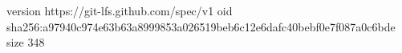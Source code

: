 version https://git-lfs.github.com/spec/v1
oid sha256:a97940c974e63b63a8999853a026519beb6c12e6dafc40bebf0e7f087a0c6bde
size 348

